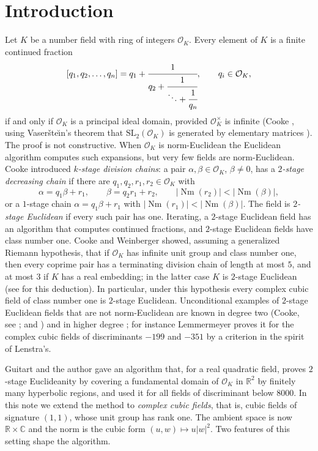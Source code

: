 \documentclass[11pt]{amsart}
\theoremstyle{definition}
\theoremstyle{remark}
\numberwithin{equation}{section}
\newcommand{\R}{\mathbb{R}}
\newcommand{\C}{\mathbb{C}}
\newcommand{\cO}{\mathcal{O}}
\newcommand{\Nm}{\operatorname{Nm}}
\begin{document}
\section{Introduction}

Let $K$ be a number field with ring of integers $\cO_K$. Every element of $K$ is a finite
continued fraction
\[
  [q_1,q_2,\dots,q_n]=q_1+\cfrac{1}{q_2+\cfrac{1}{\ddots+\cfrac{1}{q_n}}},\qquad q_i\in\cO_K,
\]
if and only if $\cO_K$ is a principal ideal domain, provided $\cO_K^\times$ is infinite
(Cooke \cite[Theorem~1, Corollary~3, Proposition~13]{Co}, using Vaser\v{s}te\u{\i}n's theorem
that $\mathrm{SL}_2(\cO_K)$ is generated by elementary matrices \cite{Va}). The proof is not
constructive. When
$\cO_K$ is norm-Euclidean the Euclidean algorithm computes such expansions, but very few
fields are norm-Euclidean. Cooke \cite{Co} introduced \emph{$k$-stage division chains}: a
pair $\alpha,\beta\in\cO_K$, $\beta\neq0$, has a \emph{$2$-stage decreasing chain} if there
are $q_1,q_2,r_1,r_2\in\cO_K$ with
\begin{equation}\label{eq:chain}
  \alpha=q_1\beta+r_1,\qquad \beta=q_2r_1+r_2,\qquad |\Nm(r_2)|<|\Nm(\beta)|,
\end{equation}
or a $1$-stage chain $\alpha=q_1\beta+r_1$ with $|\Nm(r_1)|<|\Nm(\beta)|$. The field is
\emph{$2$-stage Euclidean} if every such pair has one. Iterating, a $2$-stage Euclidean field
has an algorithm that computes continued fractions, and $2$-stage Euclidean fields have class
number one. Cooke and Weinberger \cite{CW} showed, assuming a generalized Riemann hypothesis,
that if $\cO_K$ has infinite unit group and class number one, then every coprime pair has a
terminating division chain of length at most $5$, and at most $3$ if $K$ has a real embedding;
in the latter case $K$ is $2$-stage Euclidean (see \cite[(0.16)]{Le2} for this deduction). In
particular, under this hypothesis every complex cubic field of class number one is $2$-stage
Euclidean. Unconditional examples of $2$-stage Euclidean fields that are not norm-Euclidean
are known in degree two (Cooke, see \cite[\S3]{Le2}; and \cite{GM}) and in higher degree
\cite{Ce2,Le2}; for instance
Lemmermeyer \cite[\S4]{Le2} proves it for the complex cubic fields of discriminants $-199$ and
$-351$ by a criterion in the spirit of Lenstra's.

Guitart and the author \cite{GM} gave an algorithm that, for a real quadratic field, proves
$2$-stage Euclideanity by covering a fundamental domain of $\cO_K$ in $\R^2$ by finitely many
hyperbolic regions, and used it for all fields of discriminant below $8000$. In this note we
extend the method to \emph{complex cubic fields}, that is, cubic fields of signature $(1,1)$,
whose unit group has rank one. The ambient space is now $\R\times\C$ and the norm is the cubic
form $(u,w)\mapsto u|w|^2$. Two features of this setting shape the algorithm.
\end{document}

